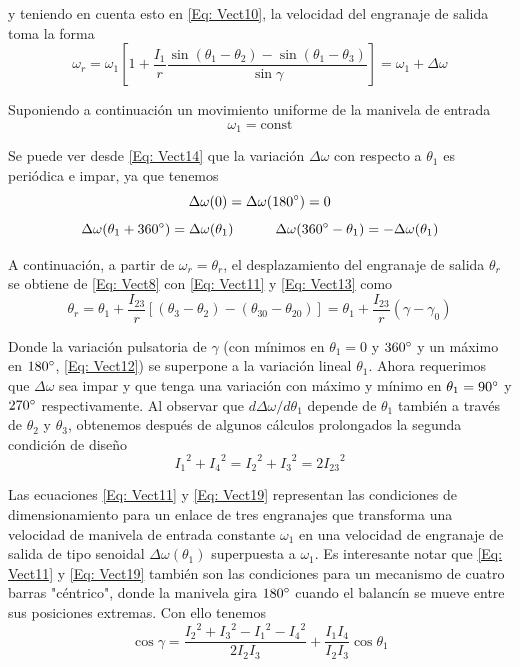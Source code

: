 \documentclass[12pt, final]{extarticle}
\begin{document}
y teniendo en cuenta esto en \eqref{Eq: Vect10}, la velocidad del engranaje de salida toma la forma
\begin{equation}
    \omega_r=\omega_1[1+\frac{I_1}{r}\frac{\sin{(\theta_1-\theta_2)}-\sin{(\theta_1-\theta_3)}}{\sin{\gamma}}]=\omega_1+\Delta\omega
   \label{Eq: Vect14}
\end{equation}

Suponiendo a continuación un movimiento uniforme de la manivela de entrada
\begin{equation}
    \omega_1=\text{const}
   \label{Eq: Vect15}
\end{equation}

Se puede ver desde \eqref{Eq: Vect14} que la variación $\Delta\omega$ con respecto a $\theta_1$ es
periódica e impar, ya que tenemos
\begin{equation}
\Delta\omega(0)=\Delta\omega(180\degree)=0
   \label{Eq: Vect16} 
\end{equation}
\begin{equation}
    \Delta\omega(\theta_1+360\degree)=\Delta\omega(\theta_1)  \quad\quad\quad \Delta\omega(360\degree-\theta_1)=-\Delta\omega(\theta_1)
   \label{Eq: Vect17} 
\end{equation}

A continuación, a partir de $\omega_r=\theta_r$, el desplazamiento del engranaje de salida $\theta_r$ se obtiene de \eqref{Eq: Vect8} con \eqref{Eq: Vect11} y \eqref{Eq: Vect13} como
\begin{equation}
    \theta_r=\theta_1+\frac{I_{23}}{r}[(\theta_3-\theta_2)-(\theta_{30}-\theta_{20})]=\theta_1+\frac{I_{23}}{r}(\gamma-\gamma_0)
   \label{Eq: Vect18} 
\end{equation}

Donde la variación pulsatoria de $\gamma$ (con mínimos en $\theta_1=0$ y $360\degree$ y un máximo en $180\degree$, \eqref{Eq: Vect12}) se superpone a la variación lineal $\theta_1$. Ahora requerimos que $\Delta\omega$ sea impar y que tenga una variación con máximo y mínimo en $\theta_1=90\degree$ y $270\degree$ respectivamente. Al observar que $d\Delta\omega/d\theta_1$ depende de $\theta_1$ también a través de $\theta_2$ y $\theta_3$, obtenemos después de algunos cálculos prolongados la segunda condición de diseño
\begin{equation}
    {I_1}^2+{I_4}^2={I_2}^2+{I_3}^2=2{I_{23}}^2
   \label{Eq: Vect19} 
\end{equation}

Las ecuaciones \eqref{Eq: Vect11} y \eqref{Eq: Vect19} representan las condiciones de dimensionamiento para un enlace de tres engranajes que transforma una velocidad de manivela de entrada constante $\omega_1$ en una velocidad de engranaje de salida de tipo senoidal $\Delta\omega(\theta_1)$ superpuesta a $\omega_1$. Es interesante notar que \eqref{Eq: Vect11} y \eqref{Eq: Vect19} también son las condiciones para un mecanismo de cuatro barras "céntrico", donde la manivela gira $180\degree$ cuando el balancín se mueve entre sus posiciones extremas. Con ello tenemos
\begin{equation}
    \cos{\gamma}=\frac{{I_2}^2+{I_3}^2-{I_1}^2-{I_4}^2}{2{I_2 I_3}}+\frac{I_1 I_4}{I_2 I_3}\cos{\theta_1}
   \label{Eq: Vect20} 
\end{equation}
\end{document}
